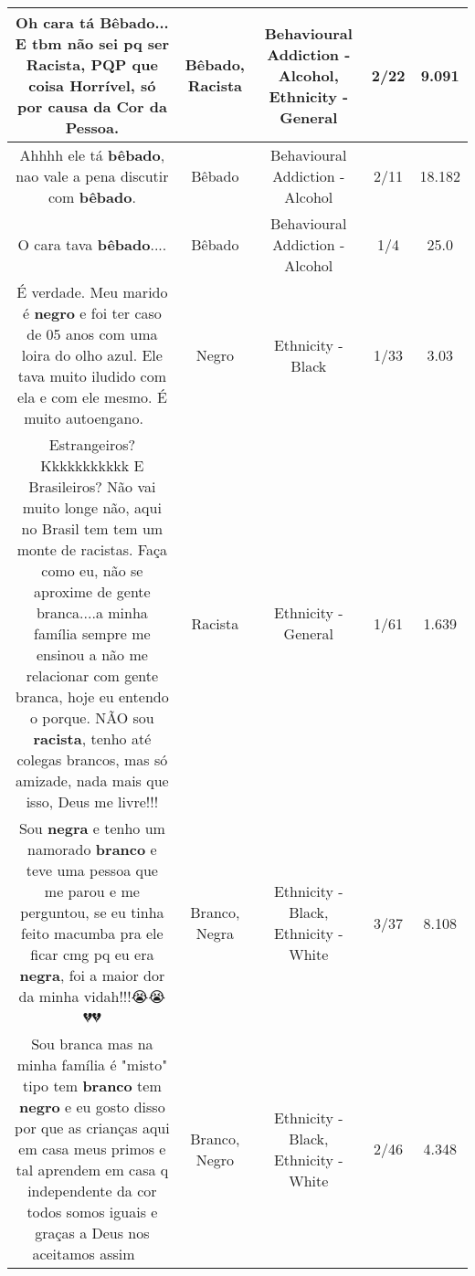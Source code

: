 \documentclass[11pt]{article}
\newlength\mylength
\begin{document}
\begin{center}
\begin{longtable}{|C{.65\mylength}|C{.30\mylength}|C{.12\mylength}|C{.12\mylength}|C{.12\mylength}|}
  \small Oh cara tá \textbf{Bêbado}... E tbm não sei pq ser \textbf{Racista}, PQP que coisa Horrível, só por causa da Cor da Pessoa.\normalsize   & Bêbado, Racista & Behavioural Addiction - Alcohol, Ethnicity - General & 2/22 & 9.091 \\  \hline
  \small Ahhhh ele tá \textbf{bêbado},  nao vale a pena discutir com \textbf{bêbado}.\normalsize   & Bêbado & Behavioural Addiction - Alcohol & 2/11 & 18.182 \\  \hline
  \small O cara tava \textbf{bêbado}....\normalsize   & Bêbado & Behavioural Addiction - Alcohol & 1/4 & 25.0 \\  \hline
  \small É verdade. Meu marido é \textbf{negro} e foi ter caso de 05 anos com uma loira do olho azul. Ele tava muito iludido com ela e com ele mesmo. É muito autoengano. 👏👏👏\normalsize   & Negro & Ethnicity - Black & 1/33 & 3.03 \\  \hline
  \small Estrangeiros? Kkkkkkkkkkk E Brasileiros? Não vai muito longe não, aqui no Brasil tem tem um monte de racistas. Faça como eu, não se aproxime de gente branca....a minha família sempre me ensinou a não me relacionar com gente branca, hoje eu entendo o porque. NÃO sou \textbf{racista}, tenho até colegas brancos, mas só amizade, nada mais que isso, Deus me livre!!!\normalsize   & Racista & Ethnicity - General & 1/61 & 1.639 \\  \hline
  \small Sou \textbf{negra} e tenho um namorado \textbf{branco} e teve uma pessoa que me parou e me perguntou, se eu tinha feito macumba pra ele ficar cmg pq eu era \textbf{negra}, foi a maior dor da minha vidah!!!😭😭💔💔\normalsize   & Branco, Negra & Ethnicity - Black, Ethnicity - White & 3/37 & 8.108 \\  \hline
  \small Sou branca mas na minha família é "misto" tipo tem \textbf{branco} tem \textbf{negro} e eu gosto disso por que as crianças aqui em casa meus primos e tal aprendem em casa q independente da cor todos somos iguais e graças a Deus nos aceitamos assim 💓💓💓\normalsize   & Branco, Negro & Ethnicity - Black, Ethnicity - White & 2/46 & 4.348 \\  \hline

\end{longtable}
\end{center}
\end{document}
